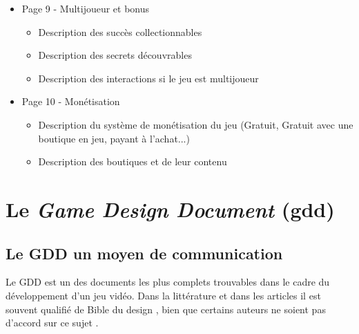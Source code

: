 \begin{itemize}
\begin{itemize}
    \end{itemize}
    \item Page 9 - Multijoueur et bonus
    \begin{itemize}
        \item Description des succès collectionnables
        \item Description des secrets découvrables
        \item Description des interactions si le jeu est multijoueur
    \end{itemize}
    \item Page 10 - Monétisation
    \begin{itemize}
        \item Description du système de monétisation du jeu (Gratuit, Gratuit avec une boutique en jeu, payant à l'achat...)
        \item Description des boutiques et de leur contenu
    \end{itemize}
\end{itemize}




\section{Le \emph{Game Design Document} (\gls{gdd})}





\subsection{Le GDD un moyen de communication}
Le GDD est un des documents les plus complets trouvables dans le cadre du développement d'un jeu vidéo. Dans la littérature et dans les articles il est souvent qualifié de \guillemotleft Bible du design \guillemotright \cite{GD_foundations_pedersen}, bien que certains auteurs ne soient pas d'accord sur ce sujet \cite{LevelUpRogers2014}. 

